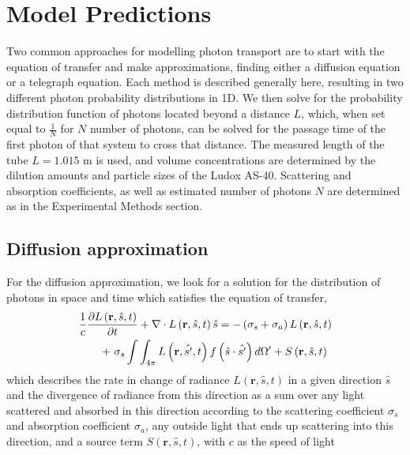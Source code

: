\documentclass[9pt,twocolumn,twoside]{opticajnl}
\begin{document}
\section{Model Predictions}\label{sec:predictions}

Two common approaches for modelling photon transport are to start with the equation of transfer and make approximations, finding either a diffusion equation or a telegraph equation. Each method is described generally here, resulting in two different photon probability distributions in 1D. We then solve for the probability distribution function of photons located beyond a distance $L$, which, when set equal to $\frac{1}{N}$ for $N$ number of photons, can be solved for the passage time of the first photon of that system to cross that distance. The measured length of the tube $L = 1.015$ m is used, and volume concentrations are determined by the dilution amounts and particle sizes of the Ludox AS-40. Scattering and absorption coefficients, as well as estimated number of photons $N$ are determined as in the Experimental Methods section.


\subsection{Diffusion approximation}\label{subsec:diffusion}

For the diffusion approximation, we look for a solution for the distribution of photons in space and time which satisfies the equation of transfer,
\begin{gather}
    \frac{1}{c} \frac{\partial L \left(\mathbf{r},\hat{s},t\right)}{\partial t} + \mathbf{\nabla} \cdot L\left(\mathbf{r},\hat{s},t\right)\hat{s} = -\left(\sigma_{s} + \sigma_{a}\right) L\left(\mathbf{r},\hat{s},t\right) \notag\\
    \ \ \ \ \ +\ \sigma_{s} \int \int_{4\pi} L\left(\mathbf{r},\hat{s'},t\right) f\left(\hat{s} \cdot \hat{s'}\right) d\Omega' + S\left(\mathbf{r},\hat{s},t\right)\label{eq:RTE}
\end{gather}
which describes the rate in change of radiance $L\left(\mathbf{r},\hat{s},t\right)$ in a given direction $\hat{s}$ and the divergence of radiance from this direction as a sum over any light scattered and absorbed in this direction according to the scattering coefficient $\sigma_{s}$ and absorption coefficient $\sigma_{a}$, any outside light that ends up scattering into this direction, and a source term $S\left(\mathbf{r},\hat{s},t\right)$, with $c$ as the speed of light  \cite{haskell_boundary_1994,ishimaru_wave_nodate}
\end{document}
